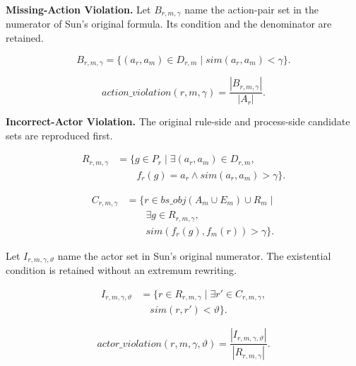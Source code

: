 \textbf{Missing-Action Violation.} Let \(B_{r,m,\gamma}\) name the action-pair set in the numerator of Sun's original formula. Its condition and the denominator are retained.

\begin{equation}
B_{r,m,\gamma}=\{(a_r,a_m)\in D_{r,m}
  \mid sim(a_r,a_m)<\gamma\}.
\label{eq:missing_set}
\end{equation}

\begin{equation}
\mathit{action\_violation}(r,m,\gamma)
=\frac{|B_{r,m,\gamma}|}{|A_r|}.
\label{eq:missing}
\end{equation}

\textbf{Incorrect-Actor Violation.} The original rule-side and process-side candidate sets are reproduced first.

\begin{equation}
\begin{aligned}
R_{r,m,\gamma}
&=\bigl\{g\in P_r
  \mid\exists(a_r,a_m)\in D_{r,m},\\
&\qquad f_r(g)=a_r\land
  sim(a_r,a_m)>\gamma\bigr\}.
\end{aligned}
\label{eq:actor_rule_candidates}
\end{equation}

\begin{equation}
\begin{aligned}
C_{r,m,\gamma}
&=\bigl\{r\in\mathit{bs\_obj}(A_m\cup E_m)
  \cup R_m\mid\\
&\qquad\exists g\in R_{r,m,\gamma},\\
&\qquad sim(f_r(g),f_m(r))>\gamma\bigr\}.
\end{aligned}
\label{eq:actor_process_candidates}
\end{equation}

Let \(I_{r,m,\gamma,\vartheta}\) name the actor set in Sun's original numerator. The existential condition is retained without an extremum rewriting.

\begin{equation}
\begin{aligned}
I_{r,m,\gamma,\vartheta}
&=\bigl\{r\in R_{r,m,\gamma}
  \mid\exists r'\in C_{r,m,\gamma},\\
&\quad sim(r,r')<\vartheta\bigr\}.
\end{aligned}
\label{eq:actor_mismatch_set}
\end{equation}

\begin{equation}
\mathit{actor\_violation}(r,m,\gamma,\vartheta)
=\frac{|I_{r,m,\gamma,\vartheta}|}{|R_{r,m,\gamma}|}.
\label{eq:actor}
\end{equation}

